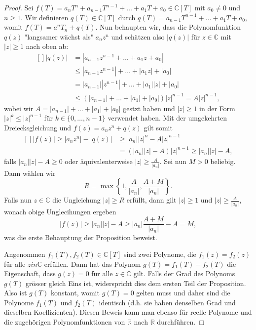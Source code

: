 \documentclass[../Analysis1_script.tex]{subfiles}
\begin{document}
\begin{proof}
	Sei $f(T) = a_n T^n + a_{n-1} T^{n-1} + \ldots + a_1 T + a_0 \in \mathbb{C}[T]$ mit $a_0 \neq 0$ und $n \geq 1$. Wir definieren $q(T) \in \mathbb{C}[T]$ durch $q(T) = a_{n-1} T^{n-1} + \ldots + a_1 T + a_0$, womit $f(T) = a^n T_n + q(T)$. Nun behaupten wir, dass die Polynomfunktion $q(z)$ "langsamer wächst als" $a_n z^n$ und schätzen also $|q(z)|$ für $z \in \mathbb{C}$ mit $|z| \geq 1$ nach oben ab:
	\[\begin{aligned}[]
		|q(z)| &= |a_{n-1}z^{n-1}+ \ldots +a_1z+a_0| \\ 
		&\leq |a_{n-1}z^{n-1}|+ \ldots +|a_1z|+|a_0|\\ 
		&= |a_{n-1}||z^{n-1}|+ \ldots +|a_1||z|+|a_0|\\ 
		&\leq (|a_{n-1}|+\ldots + |a_1| + |a_0|) |z|^{n-1} = A |z|^{n-1},
	\end{aligned}\]
	wobei wir $A= |a_{n-1}|+\ldots + |a_1| + |a_0|$ gestzt haben und $|z| \geq 1$ in der Form $|z|^k \leq |z|^{n-1}$ für $k \in \{0, \ldots, n-1\}$ verwendet haben. Mit der umgekehrten Dreiecksgleichung und $f(z) = a_n z^n + q(z)$ gilt somit
	\[\begin{aligned}[]
		|f(z)| \geq |a_nz^n| -|q(z)| &\geq |a_n||z|^n - A |z|^{n-1} \\ 
		&= (|a_n||z|-A) |z|^{n-1} \geq |a_n||z|-A,
	\end{aligned}\]
	falls $|a_n||z| - A \geq 0$ oder äquivalenterweise $|z| \geq \frac{A}{|a_n|}$. Sei nun $M > 0$ beliebig. Dann wählen wir
	\[R = \max \left \lbrace {1,\frac {A}{|a_n|},\frac {A+M}{|a_n|}} \right \rbrace .\]
	Falls nun $z \in \mathbb{C}$ die Ungleichung $|z| \geq R$ erfüllt, dann gilt $|z| \geq 1$ und $|z| \geq \frac{A}{|a_n|}$, wonach obige Unglecihungen ergeben
	\[|f(z)| \geq |a_n||z|-A \geq |a_n|\frac {A+M}{|a_n|} -A = M,\] 
	was die erste Behauptung der Proposition beweist.
	
	Angenommen $f_1(T), f_2(T) \in \mathbb {C}[T]$ sind zwei Polynome, die $f_1(z) = f_2(z)$ für alle $z in \mathbb {C}$ erfüllen. Dann hat das Polynom $g(T) = f_1(T) - f_2(T)$ die Eigenschaft, dass $g(z) = 0$ für alle $z \in \mathbb {C}$ gilt. Falls der Grad des Polynoms $g(T)$ grösser gleich Eins ist, widerspricht dies dem ersten Teil der Proposition. Also ist $g(T)$ konstant, womit $g(T) = 0$ gelten muss und daher sind die Polynome $f_1(T)$ und $f_2(T)$ identisch (d.h. sie haben denselben Grad und dieselben Koeffizienten). Diesen Beweis kann man ebenso für reelle Polynome und die zugehörigen Polynomfunktionen von $\mathbb {R}$ nach $\mathbb {R}$ durchführen.
\end{proof}
\end{document}
